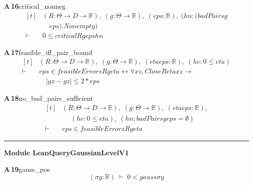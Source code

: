 \documentclass[conference]{IEEEtran}
\theoremstyle{definition}
\newcommand{\lean}[1]{\textsf{\footnotesize #1}}
\begin{document}
\noindent\textbf{A\,16}\quad\lean{critical\_nonneg}
{\footnotesize\[ \begin{aligned}[t]
&(\mathit{R} : \Theta \to \mathit{D} \to \mathbb{R} ),\; (\mathit{g} : \Theta \to \mathbb{R} ),\; (\mathit{eps} : \mathbb{R} ),\; (\mathit{hn} : (\mathit{badPairs} \mathit{g}\\
&\quad \mathit{eps}).\mathit{Nonempty})\\
\vdash\;&0 \leq \mathit{critical} \mathit{R} \mathit{g} \mathit{eps} \mathit{hn}
\end{aligned} \]}

\noindent\textbf{A\,17}\quad\lean{feasible\_iff\_pair\_bound}
{\footnotesize\[ \begin{aligned}[t]
&(\mathit{R} : \Theta \to \mathit{D} \to \mathbb{R} ),\; (\mathit{g} : \Theta \to \mathbb{R} ),\; (\mathit{eta} \mathit{eps} : \mathbb{R} ),\; (\mathit{he} : 0 \leq \mathit{eta})\\
\vdash\;&\mathit{eps} \in \mathit{feasibleErrors} \mathit{R} \mathit{g} \mathit{eta} \leftrightarrow \forall \mathit{x} \mathit{z},\mathit{Close} \mathit{R} \mathit{eta} \mathit{x} \mathit{z} \to\\
&\quad |\mathit{g} \mathit{x}-\mathit{g} \mathit{z}| \leq 2*\mathit{eps}
\end{aligned} \]}

\noindent\textbf{A\,18}\quad\lean{no\_bad\_pairs\_sufficient}
{\footnotesize\[ \begin{aligned}[t]
&(\mathit{R} : \Theta \to \mathit{D} \to \mathbb{R} ),\; (\mathit{g} : \Theta \to \mathbb{R} ),\; (\mathit{eta} \mathit{eps} : \mathbb{R} ),\\
&\quad \; (\mathit{he} : 0 \leq \mathit{eta}),\; (\mathit{hn} : \mathit{badPairs} \mathit{g} \mathit{eps}=\emptyset )\\
\vdash\;&\mathit{eps} \in \mathit{feasibleErrors} \mathit{R} \mathit{g} \mathit{eta}
\end{aligned} \]}

\vspace{4pt}\noindent\rule{\columnwidth}{0.4pt}\par\vspace{2pt}
\noindent\textbf{Module \lean{LeanQueryGaussianLevelV1}}\par\vspace{3pt}

\noindent\textbf{A\,19}\quad\lean{gauss\_pos}
{\footnotesize\[ (\sigma \mathit{y} : \mathbb{R} ) \;\vdash\; 0 < \mathit{gauss} \sigma \mathit{y} \]}
\end{document}
